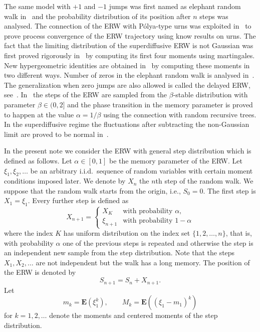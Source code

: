 \documentclass[12pt,a4paper]{article}
\newcommand{\E}{\mathbf E}
\numberwithin{equation}{section}
\begin{document}
The same model with $+1$ and $-1$ jumps was first named as elephant random walk in~\cite{ST04}
and the probability distribution of its position after $n$ steps was analysed.
The connection of the ERW with P\'olya-type urns was exploited in~\cite{BB16} to prove process convergence of the ERW trajectory using know results on urns.
The fact that the limiting distribution of the superdiffusive ERW is not Gaussian was first proved rigorously in~\cite{Bercu17}
by computing its first four moments using martingales.
New hypergeometric identities are obtained in~\cite{BCR19} by computing these moments in two different ways.
Number of zeros in the elephant random walk is analysed in~\cite{Bertoin22}.
The generalization when zero jumps are also allowed is called the delayed ERW, see~\cite{GS21,Bercu22}.
In~\cite{Bus18} the steps of the ERW are sampled from the $\beta$-stable distribution with parameter $\beta\in(0,2]$
and the phase transition in the memory parameter is proved to happen at the value $\alpha=1/\beta$ using the connection with random recursive trees.
In the superdiffusive regime the fluctuations after subtracting the non-Gaussian limit are proved to be normal in~\cite{KT19}.

In the present note we consider the ERW with general step distribution which is defined as follows.
Let $\alpha\in[0,1]$ be the memory parameter of the ERW.
Let $\xi_1,\xi_2,\dots$ be an arbitrary i.i.d.\ sequence of random variables with certain moment conditions imposed later.
We denote by $X_n$ the $n$th step of the random walk.
We suppose that the random walk starts from the origin, i.e., $S_0=0$.
The first step is $X_1=\xi_1$.
Every further step is defined as
\begin{equation}\label{defXn}
X_{n+1}=\begin{cases}X_K&\text{with probability }\alpha,\\\xi_{n+1}&\text{with probability }1-\alpha\end{cases}
\end{equation}
where the index $K$ has uniform distribution on the index set $\{1,2,\dots,n\}$,
that is, with probability $\alpha$ one of the previous steps is repeated and otherwise the step is an independent new sample from the step distribution.
Note that the steps $X_1,X_2,\dots$ are not independent but the walk has a long memory.
The position of the ERW is denoted by
\begin{equation}\label{defSn}
S_{n+1}=S_n+X_{n+1}.
\end{equation}
Let
\begin{equation}\label{defmkMk}
m_k=\E(\xi_1^k),\qquad M_k=\E\left((\xi_1-m_1)^k\right)
\end{equation}
for $k=1,2,\dots$ denote the moments and centered moments of the step distribution.
\end{document}
